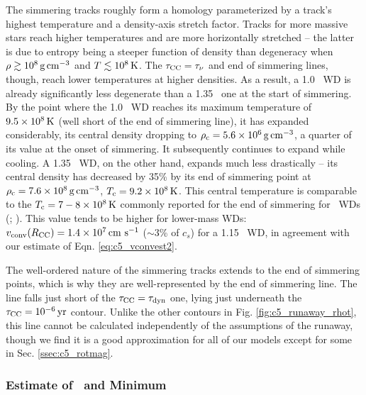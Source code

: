 
The simmering tracks roughly form a homology parameterized by a track's highest temperature and a density-axis stretch factor.  Tracks for more massive stars reach higher temperatures and are more horizontally stretched -- the latter is due to entropy being a steeper function of density than degeneracy when $\rho\gtrsim10^8\,\gcc$ and $T\lesssim10^8\,\mathrm{K}$.  The $\taucc = \taunu$ and end of simmering lines, though, reach lower temperatures at higher densities.  As a result, a 1.0 \Msun\ WD is already significantly less degenerate than a 1.35 \Msun\ one at the start of simmering.  By the point where the 1.0 \Msun\ WD reaches its maximum temperature of $9.5\times10^8\,\mathrm{K}$ (well short of the end of simmering line), it has expanded considerably, its central density dropping to $\rhoc = 5.6\times10^6\,\gcc$, a quarter of its value at the onset of simmering.  It subsequently continues to expand while cooling.  A 1.35 \Msun\ WD, on the other hand, expands much less drastically -- its central density has decreased by 35\% by its end of simmering point at $\rhoc = 7.6\times10^8\,\gcc$, $\Tc = 9.2\times10^8\,\mrm{K}$.  This central temperature is comparable to the {\charles $\Tc = 7-8\times10^8\,\mrm{K}$ commonly reported for the end of simmering for \Mch\ WDs (\citeal{wooswk04}; \citeal{piroc08})}.  This value tends to be higher for lower-mass WDs: $\vconvrcc = 1.4\times10^7\,\cmpsec$ ($\sim3$\% of $c_s$) for a 1.15 \Msun\ WD, in agreement with our estimate of Eqn. \ref{eq:c5_vconvest2}.

The well-ordered nature of the simmering tracks extends to the end of simmering points, which is why they are well-represented by the end of simmering line.  The line falls just short of the $\taucc = \taudyn$ one, lying just underneath the $\taucc = 10^{-6}\,\mrm{yr}$ contour.  Unlike the other contours in Fig. \ref{fig:c5_runaway_rhot}, this line cannot be calculated independently of the assumptions of the runaway, though we find it is a good approximation for all of our models except for some in Sec. \ref{ssec:c5_rotmag}.

\subsubsection{Estimate of \Mcrit\ and Minimum \MNi}
\label{sssec:c5_mcritest_adiabatic}

